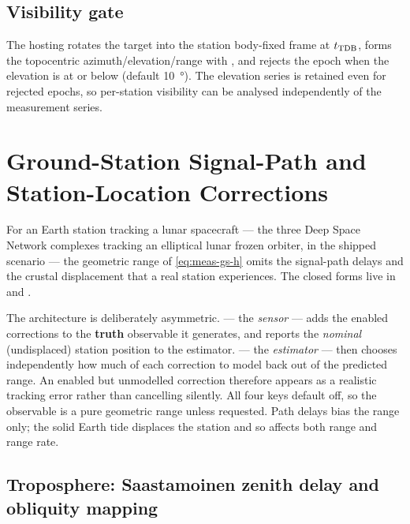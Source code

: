 \subsection{Visibility gate}

The hosting  rotates the target into the station
body-fixed frame at $t_{\mathrm{TDB}}$, forms the topocentric azimuth/elevation/range
with , and rejects the epoch when the elevation is at or
below  (default \SI{10}{\degree}). The elevation
series is retained even for rejected epochs, so per-station visibility can be
analysed independently of the measurement series.

\section{Ground-Station Signal-Path and Station-Location Corrections}
\label{sec:meas-gs-corrections}

For an Earth station tracking a lunar spacecraft --- the three Deep Space
Network complexes tracking an elliptical lunar frozen orbiter, in the shipped
 scenario --- the geometric range of
\cref{eq:meas-gs-h} omits the signal-path delays and the crustal displacement
that a real station experiences. The closed forms live in
 and
.

The architecture is deliberately asymmetric.  ---
the \emph{sensor} --- adds the enabled corrections to the \textbf{truth}
observable it generates, and reports the \emph{nominal} (undisplaced) station
position to the estimator.  --- the
\emph{estimator} --- then chooses independently how much of each correction to
model back out of the predicted range. An enabled but unmodelled correction
therefore appears as a realistic tracking error rather than cancelling
silently. All four  keys default off, so the observable is a
pure geometric range unless requested. Path delays bias the range only; the
solid Earth tide displaces the station and so affects both range and range
rate.

\subsection{Troposphere: Saastamoinen zenith delay and obliquity mapping}
\label{sec:meas-troposphere}

